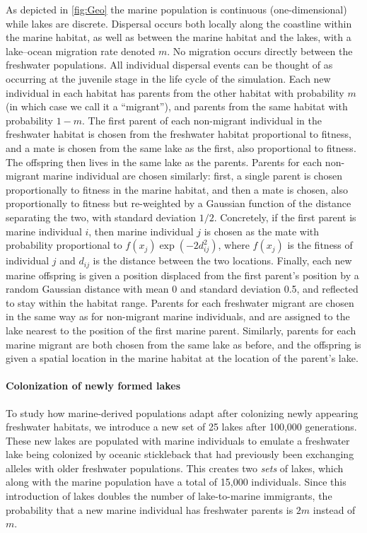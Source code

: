 \documentclass{article}
\begin{document}
As depicted in \autoref{fig:Geo} the marine population is continuous (one-dimensional) while lakes are discrete. 
Dispersal occurs both locally along the coastline within the marine habitat, as well as between the marine habitat and the lakes,
with a lake--ocean migration rate denoted $m$. 
No migration occurs directly between the freshwater populations. 
All individual dispersal events can be thought of as occurring at the juvenile stage in the life cycle of the simulation. 
Each new individual in each habitat has parents from the other habitat with probability $m$ (in which case we call it a ``migrant''), and parents from the same habitat with probability $1-m$.
The first parent of each non-migrant individual in the freshwater habitat is chosen from the freshwater habitat proportional to fitness, and a mate is chosen from the same lake as the first, also proportional to fitness. The offspring then lives in the same lake as the parents. Parents for each non-migrant marine individual are chosen similarly:
first, a single parent is chosen proportionally to fitness in the marine habitat, and then a mate is chosen, also proportionally to fitness but re-weighted by a Gaussian function of the distance separating the two, with standard deviation $1/2$. Concretely, if the first parent is marine individual $i$, then marine individual $j$ is chosen as the mate with probability proportional to $f(x_j) \exp(-2d_{ij}^2)$, where $f(x_j)$ is the fitness of individual $j$ and $d_{ij}$ is the distance between the two locations. 
Finally, each new marine offspring is given a position displaced from the first parent's position by a random Gaussian distance with mean 0 and standard deviation 0.5, and reflected to stay within the habitat range.
Parents for each freshwater migrant are chosen in the same way as for non-migrant marine individuals, and are assigned to the lake nearest to the position of the first marine parent. Similarly, parents for each marine migrant are both chosen from the same lake as before, and the offspring is given a spatial location in the marine habitat at the location of the parent's lake. 

\paragraph{Colonization of newly formed lakes} 

To study how marine-derived populations adapt after colonizing newly appearing freshwater habitats, we introduce a new set of 25 lakes after 100,000 generations. 
These new lakes are populated with marine individuals to emulate a freshwater lake being colonized by oceanic stickleback that had previously been exchanging alleles with older freshwater populations. 
This creates two \emph{sets} of lakes, which along with the marine population have a total of 15,000 individuals. Since this introduction of lakes doubles the number of lake-to-marine immigrants, the probability that a new marine individual has freshwater parents is $2m$ instead of $m$.
\end{document}

